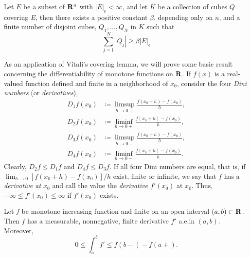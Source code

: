 \begin{theorem}
Let $E$ be a subset of $\mathbf{R}^n$ with $|E|_e<\infty$, and let $K$ be a
collection of cubes $Q$ covering $E$, then there exists a positive constant
$\beta$, depending only on $n$, and a finite number of disjoint cubes,
$Q_1,\dotsc,Q_N$ in $K$ such that
\[
\sum_{j=1}^N|Q_j|\geq\beta|E|_e
\]
\end{theorem}

As an application of Vitali's covering lemma, we will prove some basic
result concerning the differentiability of monotone functions on $\mathbf{R}$. If
$f(x)$ is a real-valued function defined and finite in a neighborhood of
$x_0$, consider the four \emph{Dini numbers} (or \emph{derivatives}),
\[
\begin{aligned}
D_1f(x_0)&\coloneqq\limsup_{h\to 0+}\frac{f(x_0+h)-f(x_0)}{h},\\
D_2f(x_0)&\coloneqq\liminf_{h\to 0+}\frac{f(x_0+h)-f(x_0)}{h},\\
D_3f(x_0)&\coloneqq\limsup_{h\to 0-}\frac{f(x_0+h)-f(x_0)}{h},\\
D_4f(x_0)&\coloneqq\liminf_{h\to 0-}\frac{f(x_0+h)-f(x_0)}{h}.
\end{aligned}
\]
Clearly, $D_2f\leq D_1f$ and $D_4f\leq D_3f$. If all four Dini numbers are
equal, that is, if $\lim_{h\to 0}[f(x_0+h)-f(x_0)]/h$ exist, finite or
infinite, we say that $f$ has a \emph{derivative at $x_0$} and call the
value the \emph{derivative $f'(x_0)$} at $x_0$. Thus, $-\infty\leq
f'(x_0)\leq\infty$ if $f'(x_0)$ exists.
\begin{theorem}[7.21]
Let $f$ be monotone increasing function and finite on an open interval
$(a,b)\subset\mathbf{R}$. Then $f$ has a measurable, nonnegative, finite
derivative $f'$ a.e.\@ in $(a,b)$. Moreover,
\[
0\leq\int_a^b f'\leq f(b-)-f(a+).
\]
\end{theorem}

